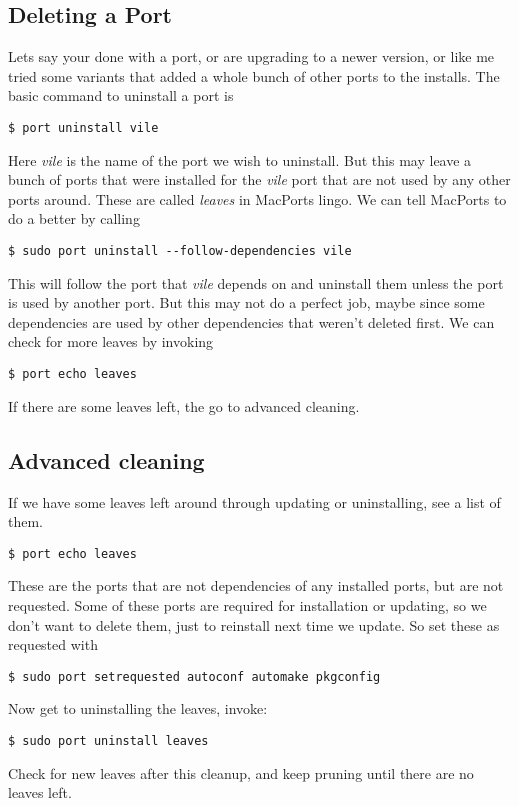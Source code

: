 \documentclass[11pt, A4paper]{article}
\begin{document}
\subsection{Deleting a Port}
Lets say your done with a port, or are upgrading to a newer version, or like me tried some variants that added a whole bunch of other ports to the installs. The basic command to uninstall a port is 
\begin{lstlisting}[style=Bash]
$ port uninstall vile
\end{lstlisting}
Here \textit{vile} is the name of the port we wish to uninstall. But this may leave a bunch of ports that were installed for the \textit{vile} port that are not used by any other ports around. These are called \textit{leaves} in MacPorts lingo. We can tell MacPorts to do a better by calling
\begin{lstlisting}[style=Bash]
$ sudo port uninstall --follow-dependencies vile
\end{lstlisting}
This will follow the port that {\it vile} depends on and uninstall them unless the port is used by another port. But this may not do a perfect job, maybe since some dependencies are used by other dependencies that weren't deleted first. We can check for more leaves by invoking
\begin{lstlisting}[style=Bash]
$ port echo leaves
\end{lstlisting}
If there are some leaves left, the go to advanced cleaning.


\subsection{Advanced cleaning}
If we have some leaves left around through updating or uninstalling, see a list of them.
\begin{lstlisting}[style=Bash]
$ port echo leaves
\end{lstlisting}
These are the ports that are not dependencies of any installed ports, but are not requested. Some of these ports are required for installation or updating, so we don't want to delete them, just to reinstall next time we update. So set these as requested with
\begin{lstlisting}[style=Bash]
$ sudo port setrequested autoconf automake pkgconfig
\end{lstlisting}

Now get to uninstalling the leaves, invoke:
\begin{lstlisting}[style=Bash]
$ sudo port uninstall leaves
\end{lstlisting}
Check for new leaves after this cleanup, and keep pruning until there are no leaves left.
\end{document}
